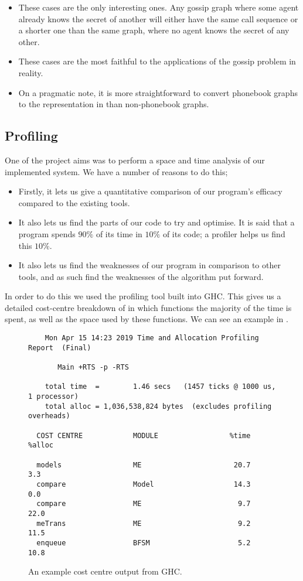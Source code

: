 \documentclass[12pt, a4paper]{article}
\begin{document}
\begin{itemize}
\item These cases are the only interesting ones. Any gossip graph where some
  agent already knows the secret of another will either have the same call
  sequence or a shorter one than the same graph, where no agent knows the secret
  of any other.
\item These cases are the most faithful to the applications of the gossip
  problem in reality.
\item On a pragmatic note, it is more straightforward to convert phonebook
  graphs to the representation in \cite{GithubGossip} than non-phonebook graphs.
\end{itemize}

\subsection{Profiling}

One of the project aims was to perform a space and time analysis of our
implemented system. We have a number of reasons to do this;

\begin{itemize}
\item Firstly, it lets us give a quantitative comparison of our program's
  efficacy compared to the existing tools.
\item It also lets us find the parts of our code to try and optimise. It is said
  that a program spends $90\%$ of its time in $10\%$ of its code; a profiler helps
  us find this $10\%$.
\item It also lets us find the weaknesses of our program in comparison to other
  tools, and as such find the weaknesses of the algorithm put forward. 
\end{itemize}

In order to do this we used the profiling tool built into GHC. This gives us a
detailed cost-centre breakdown of in which functions the majority of the time is
spent, as well as the space used by these functions. We can see an example in
.

\begin{figure}[h]
\begin{verbatim}
	Mon Apr 15 14:23 2019 Time and Allocation Profiling Report  (Final)

	   Main +RTS -p -RTS

	total time  =        1.46 secs   (1457 ticks @ 1000 us, 1 processor)
	total alloc = 1,036,538,824 bytes  (excludes profiling overheads)

  COST CENTRE            MODULE                 %time %alloc

  models                 ME                      20.7    3.3
  compare                Model                   14.3    0.0
  compare                ME                       9.7   22.0
  meTrans                ME                       9.2   11.5
  enqueue                BFSM                     5.2   10.8
\end{verbatim}
  \caption{An example cost centre output from GHC.}
  \label{fig:costcentre}
\end{figure}
\end{document}
